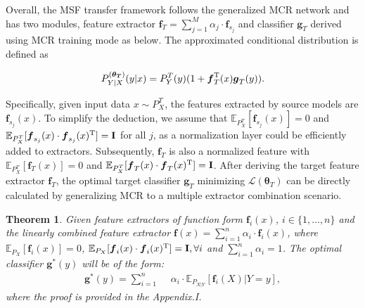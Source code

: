 \documentclass[letterpaper]{article} %
\newtheorem{theorem}{Theorem}
\begin{document}
Overall, the MSF transfer framework follows the generalized MCR\citep{xu2020maximal} network and has two modules, feature extractor $\boldsymbol{f}_T = \sum_{j=1}^M \alpha_j \cdot \boldsymbol{f}_{s_j}$ and classifier $\boldsymbol{g}_T$ derived using MCR training mode as below. The approximated conditional distribution is defined as


\begin{equation}
    P^{(\boldsymbol{\theta_T})}_{Y|X} (y|x) = P^T_Y(y) (1+\boldsymbol{f}_T^{\rm T}(x)\boldsymbol{g}_T(y)).
\end{equation}


Specifically, given input data $x \sim P^T_X$, the features extracted by source models are $\boldsymbol{f}_{s_j}(x)$. To simplify the deduction, we assume that $\mathbb{E}_{P^T_X}[\boldsymbol{f}_{s_j}(x)] = 0$ and $\mathbb{E}_{P^T_X}[\boldsymbol{f}_{s_j}(x)\cdot \boldsymbol{f}_{s_j}(x)^{\rm T}] = \mathbf{I}$ for all $j$, as a normalization layer could be efficiently added to extractors. Subsequently, $\boldsymbol{f}_T$ is also a normalized feature with $\mathbb{E}_{P^T_X}[\boldsymbol{f}_{T}(x)] = 0$ and $\mathbb{E}_{P^T_X}[\boldsymbol{f}_{T}(x)\cdot \boldsymbol{f}_{T}(x)^{\rm T}] = \mathbf{I}$. After deriving the target feature extractor $\boldsymbol{f}_T$, the optimal target classifier $\boldsymbol{g}_T$ minimizing $\mathcal L(\boldsymbol{\theta}_T)$ can be directly calculated by generalizing MCR to a multiple extractor combination scenario.

\begin{theorem}
    Given feature extractors of function form $\boldsymbol{f}_{i}(x)$, $i \in \{1,\dots, n\} $ and the linearly combined feature extractor $\boldsymbol{f}(x) = \sum_{i=1}^n \alpha_i \cdot \boldsymbol{f}_i(x)$, where $\mathbb{E}_{P_X}[\boldsymbol{f}_i(x)] = 0$, $\mathbb{E}_{P_X}[\boldsymbol{f}_i(x)\cdot \boldsymbol{f}_i(x)^{\rm T}] = \mathbf{I}, \forall i$ and $\sum_{i=1}^n \alpha_i = 1$. The optimal classifier $\boldsymbol{g}^*(y)$ will be of the form:
    \begin{equation}
    \begin{aligned}
        \boldsymbol{g}^*(y) =   \sum_{i=1}^n\ \  & \alpha_i \cdot \mathbb{E}_{P_{X|Y}}[\boldsymbol{f}_i(X)|Y=y],
    \end{aligned}
    \label{gnet}
    \end{equation}
    \label{getg}
    where the proof is provided in the Appendix.I.
\end{theorem}
\end{document}
